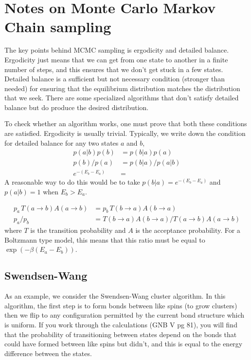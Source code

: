 \documentclass[aps,prl,twocolumn]{revtex4-1}
\begin{document}
\section{Notes on Monte Carlo Markov Chain sampling}
The key points behind MCMC sampling is ergodicity and detailed balance. Ergodicity just means that we can get from one state to another in a finite number of steps, and this ensures that we don't get stuck in a few states. Detailed balance is a sufficient but not necessary condition (stronger than needed) for ensuring that the equilibrium distribution matches the distribution that we seek. There are some specialized algorithms that don't satisfy detailed balance but do produce the desired distribution.

To check whether an algorithm works, one must prove that both these conditions are satisfied. Ergodicity is usually trivial. Typically, we write down the condition for detailed balance for any two states $a$ and $b$,
\begin{align}
	p(a|b)p(b) &= p(b|a)p(a) \\
	p(b)/p(a) &= p(b|a)/p(a|b) \\
	e^{-(E_b-E_a)} &= 
\end{align}
A reasonable way to do this would be to take $p(b|a) = e^{-(E_b-E_a)}$ and $p(a|b) = 1$ when $E_b>E_a$.

\begin{align}
	p_a\,T(a\rightarrow b)A(a\rightarrow b) &= p_b\,T(b\rightarrow a)A(b\rightarrow a)\\
	p_a/p_b &= T(b\rightarrow a)A(b\rightarrow a)/T(a\rightarrow b)A(a\rightarrow b)
\end{align}
where $T$ is the transition probability and $A$ is the acceptance probability. For a Boltzmann type model, this means that this ratio must be equal to $\exp(-\beta(E_a-E_b))$.

\subsection{Swendsen-Wang}
As an example, we consider the Swendsen-Wang cluster algorithm. In this algorithm, the first step is to form bonds between like spins (to grow clusters) then we flip to any configuration permitted by the current bond structure which is uniform. If you work through the calculations (GNB V pg 81), you will find that the probability of transitioning between states depend on the bonds that could have formed between like spins but didn't, and this is equal to the energy difference between the states.
\end{document}
